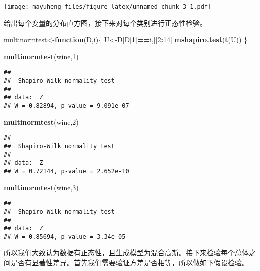 \documentclass[]{article}
\newenvironment{Shaded}{\begin{snugshade}}{\end{snugshade}}
\newcommand{\ControlFlowTok}[1]{\textcolor[rgb]{0.13,0.29,0.53}{\textbf{#1}}}
\newcommand{\DecValTok}[1]{\textcolor[rgb]{0.00,0.00,0.81}{#1}}
\newcommand{\KeywordTok}[1]{\textcolor[rgb]{0.13,0.29,0.53}{\textbf{#1}}}
\newcommand{\NormalTok}[1]{#1}
\newcommand{\OperatorTok}[1]{\textcolor[rgb]{0.81,0.36,0.00}{\textbf{#1}}}
\begin{document}
\texttt{[image: mayuheng\_files/figure-latex/unnamed-chunk-3-1.pdf]}

给出每个变量的分布直方图，接下来对每个类别进行正态性检验。

\begin{Shaded}
\begin{Highlighting}[]
\NormalTok{multinormtest<-}\ControlFlowTok{function}\NormalTok{(D,i)\{}
\NormalTok{  U<-D[D[}\DecValTok{1}\NormalTok{]}\OperatorTok{==}\NormalTok{i,][}\DecValTok{2}\OperatorTok{:}\DecValTok{14}\NormalTok{]}
  \KeywordTok{mshapiro.test}\NormalTok{(}\KeywordTok{t}\NormalTok{(U))}
\NormalTok{\}}
\end{Highlighting}
\end{Shaded}

\begin{Shaded}
\begin{Highlighting}[]
\KeywordTok{multinormtest}\NormalTok{(wine,}\DecValTok{1}\NormalTok{)}
\end{Highlighting}
\end{Shaded}

\begin{verbatim}
## 
##  Shapiro-Wilk normality test
## 
## data:  Z
## W = 0.82894, p-value = 9.091e-07
\end{verbatim}

\begin{Shaded}
\begin{Highlighting}[]
\KeywordTok{multinormtest}\NormalTok{(wine,}\DecValTok{2}\NormalTok{)}
\end{Highlighting}
\end{Shaded}

\begin{verbatim}
## 
##  Shapiro-Wilk normality test
## 
## data:  Z
## W = 0.72144, p-value = 2.652e-10
\end{verbatim}

\begin{Shaded}
\begin{Highlighting}[]
\KeywordTok{multinormtest}\NormalTok{(wine,}\DecValTok{3}\NormalTok{)}
\end{Highlighting}
\end{Shaded}

\begin{verbatim}
## 
##  Shapiro-Wilk normality test
## 
## data:  Z
## W = 0.85694, p-value = 3.34e-05
\end{verbatim}

所以我们大致认为数据有正态性，且生成模型为混合高斯。接下来检验每个总体之间是否有显著性差异。首先我们需要验证方差是否相等，所以做如下假设检验。
\end{document}
